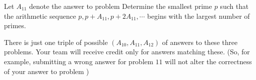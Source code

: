 Let $A_{11}$ denote the answer to problem   Determine the smallest prime $p$ such that the arithmetic sequence $p,p+A_{11},p+2A_{11},\cdots$ begins with the largest number of primes.

There is just one triple of possible $(A_{10},A_{11},A_{12})$ of answers to these three problems. Your team will receive credit only for answers matching these. (So, for example, submitting a wrong answer for problem $11$ will not alter the correctness of your answer to problem )